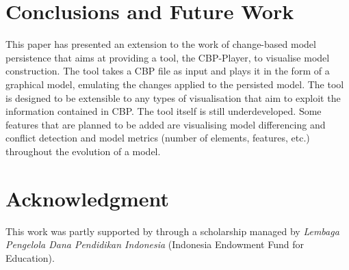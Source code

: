 \documentclass[conference]{IEEEtran}
\begin{document}
\section{Conclusions and Future Work}
\label{sec:conclusions_and_future_work}
This paper has presented an extension to the work of change-based model persistence
that aims at providing a tool, the CBP-Player, to visualise model construction. 
The tool takes a CBP file as input and plays it in the form of a graphical model,
emulating the changes applied to the persisted model. 
The tool is designed to be extensible to any types of visualisation that aim
to exploit the information contained in CBP. The tool itself is still underdeveloped. 
Some features that are planned to be added are visualising model differencing
and conflict detection and model metrics 
(number of elements, features, etc.) throughout the evolution of a model.



\section*{Acknowledgment}
This work was partly supported by through a scholarship managed by \emph{Lembaga Pengelola Dana Pendidikan Indonesia} (Indonesia Endowment Fund for Education).



\end{document}
